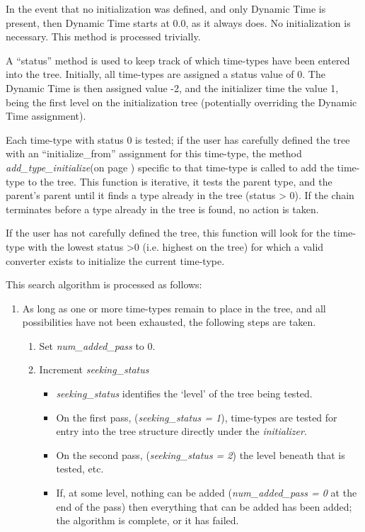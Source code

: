 {\begin{enumerate}
{\begin{enumerate}
\bigskip
In the event that no initialization was defined, and only Dynamic Time
is present, then Dynamic Time starts at 0.0, as it always does. No
initialization is necessary.  This method is processed trivially.

A {\textquotedblleft}status{\textquotedblright} method is used to keep
track of which time-types have been entered into the tree.  Initially,
all time-types are assigned a status value of 0.  The Dynamic Time is
then assigned value -2, and the initializer time the value 1, being the
first level on the initialization tree (potentially overriding the
Dynamic Time assignment).

Each time-type with status 0 is tested; if the user has carefully
defined the tree with an
{\textquotedblleft}initialize\_from{\textquotedblright} assignment for
this time-type, the method \textit{add\_type\_initialize}(on page
\pageref{ref:addtypeinitialize}) 
specific to
that time-type is called to add the time-type to the tree.  This
function is iterative, it tests the parent type, and the
parent's parent until it finds a type already in the
tree (status {\textgreater} 0).  If the chain terminates before a type
already in the tree is found, no action is taken.

If the user has not carefully defined the tree, this function will look
for the time-type with the lowest status {\textgreater}0 (i.e. highest
on the tree) for which a valid converter exists to initialize the
current time-type.

This search algorithm is processed as follows:

{\begin{enumerate}
\item As long as one or more time-types remain to place in the tree, and all
possibilities have not been exhausted, the following steps are taken.

{\begin{enumerate}
\item Set \textit{num\_added\_pass} to 0.
\item Increment \textit{seeking\_status}
\begin{itemize}
\item \textit{seeking\_status} identifies the `level' of the
tree being tested.  
\item On the first pass, (\textit{seeking\_status = 1}),
time-types are tested for entry into the tree structure 
directly under the \textit{initializer}.
\item On the second pass, (\textit{seeking\_status = 2}) the level beneath 
that is tested, etc.  
\item If, at some level, nothing can be added (\textit{num\_added\_pass  = 0} 
at the end of
the pass) then everything that can be added has been added; the algorithm is
complete, or it has failed.
\end{itemize}


\end{enumerate}}
\end{enumerate}}
\end{enumerate}}
\end{enumerate}}
